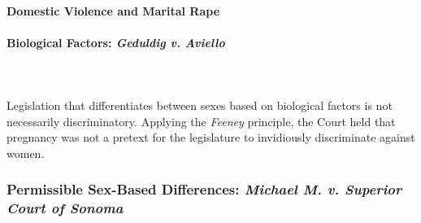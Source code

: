 \paragraph{Domestic Violence and Marital Rape}
 
\paragraph{Biological Factors: \emph{Geduldig v. Aviello}}
~\\\\
Legislation that differentiates between sexes based on biological factors is 
not necessarily discriminatory. Applying the \emph{Feeney} principle, the 
Court held that pregnancy was not a pretext for the legislature to invidiously 
discriminate against women.

\subsubsection{Permissible Sex-Based Differences: \emph{Michael M. v. Superior 
Court of Sonoma}}

